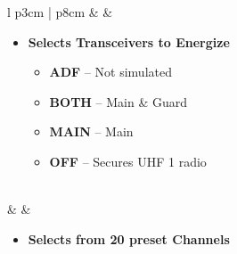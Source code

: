 \documentclass[8pt,usenames,dvipsnames,twoside]{article}
\begin{document}
\begin{center}
\begin{longtable}{l p{3cm} | p{8cm}}
			\midrule
			\textbullet &  &
			\begin{minipage}[t]{\linewidth}
				\vspace{-7pt}
				\begin{itemize}
					\item \textbf{Selects Transceivers to Energize}
					\begin{itemize}
						\item \textbf{ADF} -- Not simulated
						\item \textbf{BOTH} --  Main \& Guard
						\item \textbf{MAIN} -- Main
						\item \textbf{OFF} -- Secures UHF 1 radio
					\end{itemize}
				\end{itemize}
			\end{minipage} \\
			\midrule
			\textbullet &  &
			\begin{minipage}[t]{\linewidth}
				\vspace{-7pt}
				\begin{itemize}
					\item \textbf{Selects from 20 preset Channels}
				\end{itemize}
			\end{minipage} \\
			\bottomrule
		\end{longtable}
	\end{center}
\end{document}
